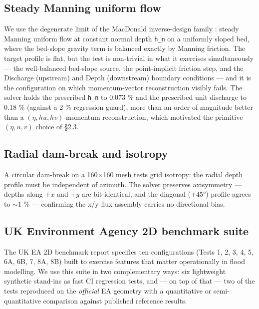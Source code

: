 \subsection{Steady Manning uniform
flow}

We use the degenerate limit of the MacDonald inverse-design family
\citep{MacDonald1997}: steady Manning uniform flow at constant normal
depth \texttt{h\_n} on a uniformly sloped bed, where the bed-slope
gravity term is balanced exactly by Manning friction. The target profile
is flat, but the test is non-trivial in what it exercises simultaneously
--- the well-balanced bed-slope source, the point-implicit friction
step, and the Discharge (upstream) and Depth (downstream) boundary
conditions --- and it is the configuration on which momentum-vector
reconstruction visibly fails. The solver holds the prescribed
\texttt{h\_n} to 0.073 \% and the prescribed unit discharge to 0.18 \%
(against a 2 \% regression guard), more than an order of magnitude
better than a \((\eta , hu, hv)\)-momentum reconstruction, which
motivated the primitive \((\eta , u, v)\) choice of §2.3.

\subsection{Radial dam-break and
isotropy}

A circular dam-break on a 160×160 mesh tests grid isotropy: the radial
depth profile must be independent of azimuth. The solver preserves
axisymmetry --- depths along \(+x\) and \(+y\) are bit-identical, and
the diagonal (\(+45°\)) profile agrees to $\sim$1 \% ---
confirming the x/y flux assembly carries no directional bias.

\subsection{UK Environment Agency 2D benchmark
suite}

The UK EA 2D benchmark report \citep{NeelzPender2013} specifies ten
configurations (Tests 1, 2, 3, 4, 5, 6A, 6B, 7, 8A, 8B) built to
exercise features that matter operationally in flood modelling. We use
this suite in two complementary ways: six lightweight synthetic
stand-ins as fast CI regression tests, and --- on top of that --- two of
the tests reproduced on the \emph{official} EA geometry with a
quantitative or semi-quantitative comparison against published reference
results.

